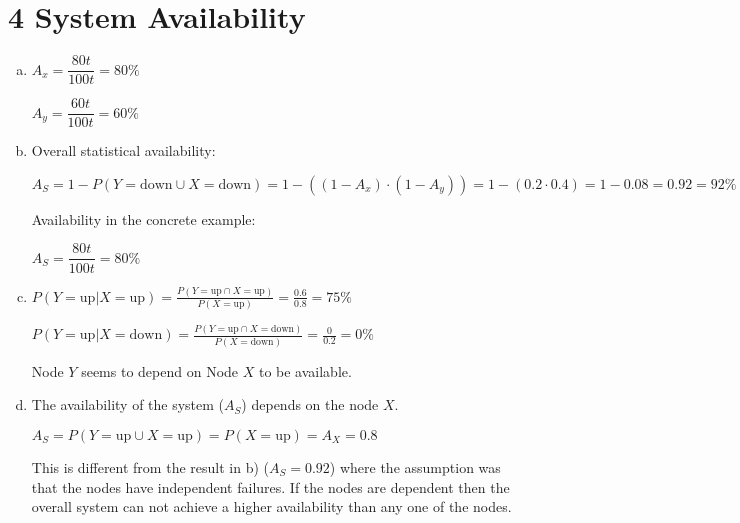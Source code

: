 \documentclass{scrartcl}
\begin{document}
\section*{4 System Availability}

\begin{enumerate}[a)]
	\item $ A_x = \dfrac{80t}{100t} = 80\% $

		$ A_y = \dfrac{60t}{100t} = 60\%$

	\item Overall statistical availability:

		$ A_S = 1 - P(Y=\text{down} \cup X=\text{down}) = 1 - ((1 - A_x) \cdot (1 - A_y)) = 1 - (0.2 \cdot 0.4) = 1 - 0.08 = 0.92 = 92\%$

		Availability in the concrete example:

		$ A_S = \dfrac{80t}{100t} = 80\% $

	\item $ P(Y=\text{up}|X=\text{up}) = \frac{P(Y=\text{up} \cap X=\text{up})}{P(X=\text{up})} = \frac{0.6}{0.8} = 75\% $

		$ P(Y=\text{up}|X=\text{down}) = \frac{P(Y=\text{up} \cap X=\text{down})}{P(X=\text{down})} = \frac{0}{0.2} = 0\% $

		Node $Y$ seems to depend on Node $X$ to be available.

	\item The availability of the system ($ A_S $) depends on the node $X$.

		$ A_S = P(Y=\text{up} \cup X=\text{up}) = P(X=\text{up}) = A_X = 0.8 $

		This is different from the result in b) ($ A_S = 0.92 $) where the assumption was that the nodes have independent failures.
		If the nodes are dependent then the overall system can not achieve a higher availability than any one of the nodes.

\end{enumerate}
\end{document}
